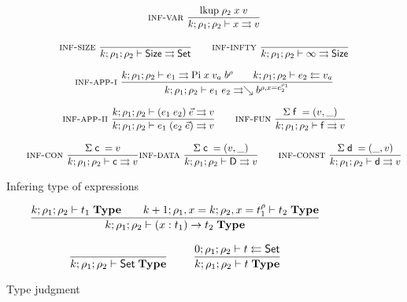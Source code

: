 \begin{figure}[p]
\begin{gather*}
	  \mbox{\sc inf-var}\ \dfrac{\mathrm{lkup} \; \rho_2 \; x \; v}{k;\rho_1;\rho_2\vdash x\rightrightarrows v}
\\[2ex]
	  \mbox{\sc inf-size}\ \dfrac{}{k;\rho_1;\rho_2\vdash\mathsf{Size}\rightrightarrows\mathsf{Set}}
\qquad
	  \mbox{\sc inf-infty}\ \dfrac{}{k;\rho_1;\rho_2\vdash\infty\rightrightarrows\mathsf{Size}} 
\\[2ex]
\mbox{\sc inf-app-i}\ \dfrac{k;\rho_1;\rho_2\vdash e_1\rightrightarrows\mathrm{Pi} \; x \; v_a \; b^{\rho}
\qquad k;\rho_1;\rho_2\vdash e_2\leftleftarrows v_a}{k;\rho_1;\rho_2\vdash e_1 \; e_2\rightrightarrows\searrow b^{\rho,x=e_2^{\rho_1}}}
\\[2ex]
\mbox{\sc inf-app-ii}\ \dfrac{k;\rho_1;\rho_2\vdash(e_1 \; e_2)\;\vec{e}\rightrightarrows v}{k;\rho_1;\rho_2\vdash e_1 \; (e_2 \; \vec{e})\rightrightarrows v}
\qquad
\mbox{\sc inf-fun}\ \dfrac{\mathrm{\Sigma} \; \mathsf{f} \; = (v,\_) }{k;\rho_1;\rho_2\vdash\mathsf{f}\rightrightarrows v}
\\[2ex]
\qquad
\mbox{\sc inf-con}\ \dfrac{\mathrm{\Sigma} \; \mathsf{c} \; = v}{k;\rho_1;\rho_2\vdash\mathsf{c}\rightrightarrows v} 
\mbox{\sc inf-data}\ \dfrac{\mathrm{\Sigma} \; \mathsf{c} \; = (v,\_)}{k;\rho_1;\rho_2\vdash\mathsf{D}\rightrightarrows v} 
\qquad
\mbox{\sc inf-const}\ \dfrac{\mathrm{\Sigma} \; \mathsf{d} \; = (\_,v)}{k;\rho_1;\rho_2\vdash\mathsf{d}\rightrightarrows v}
\end{gather*}
\caption{Infering type of expressions}
\end{figure}

\begin{figure}
\begin{gather*}
\ \dfrac{k;\rho_1;\rho_2\vdash t_1\;\mathbf{Type}
\qquad
k+1;\rho_1,x=k;\rho_2,x=t_1^{\rho}\vdash t_2\;\mathbf{Type}}{k;\rho_1;\rho_2\vdash( x : t_1 ) \rightarrow{t_2}\;\mathbf{Type}}
\\[2ex]
\ \dfrac{}{k;\rho_1;\rho_2\vdash\mathsf{Set}\;\mathbf{Type}}
\qquad
\ \dfrac{0;\rho_1;\rho_2\vdash t\leftleftarrows\mathsf{Set}}{k;\rho_1;\rho_2\vdash t\;\mathbf{Type}}
\end{gather*}
\caption{Type judgment}
\end{figure}

